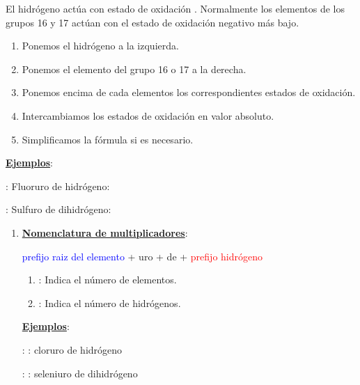 \documentclass[12pt]{article}
\begin{document}
El hidrógeno actúa con estado de oxidación . Normalmente los elementos de los grupos 16 y 17 actúan con el estado de oxidación negativo más bajo.

\vspace*{2mm}
\begin{enumerate}[label=\itembolascolor{\arabic*}{green!40!black}]
    \item Ponemos el hidrógeno a la izquierda.
    \item Ponemos el elemento del grupo 16 o 17 a la derecha.
    \item Ponemos encima de cada elementos los correspondientes estados de oxidación.
    \item Intercambiamos los estados de oxidación en valor absoluto.
    \item Simplificamos la fórmula si es necesario.
\end{enumerate}

\textbf{\uline{Ejemplos}}:

 : Fluoruro de hidrógeno: 

 : Sulfuro de dihidrógeno: 

\vspace*{2mm}

\begin{enumerate}[label=\itembolascolor{\arabic*}{blue}]
    \item \textbf{\uline{Nomenclatura de multiplicadores}}:
          \begin{center}
              \textcolor{blue}{prefijo} \textcolor{blue}{raiz del elemento} + \textcolor{mygreen}{uro} + de + \textcolor{red}{prefijo} \textcolor{red}{hidrógeno}
          \end{center}
          \begin{enumerate}[label=\textcolor{red}{$\bullet$}]
              \item {}: Indica el número de elementos.
              \item {}: Indica el número de hidrógenos.
          \end{enumerate}

          \textbf{\uline{Ejemplos}}:

           : : cloruro de hidrógeno

           : : seleniuro de dihidrógeno

\end{enumerate}
\end{document}

